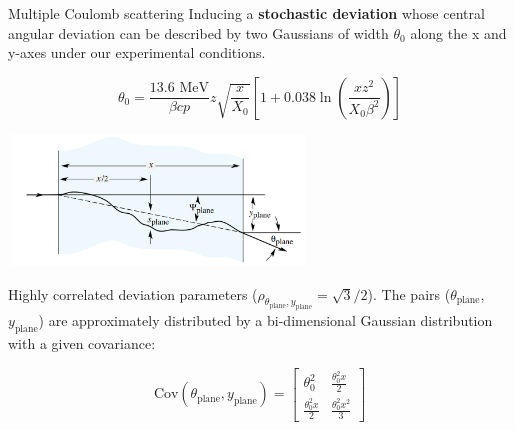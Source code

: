 \documentclass[handout,8 pt]{beamer}
\begin{document}
\begin{frame}{Multiple Coulomb scattering}
\justifying
Inducing a \alert{\textbf{stochastic deviation}} whose central angular deviation can be described by two Gaussians of width $\theta_0$ along the x and y-axes under our experimental conditions.

\begin{equation*}
\label{eq:Moliere}
\theta_0 = \frac{13.6 \text{ MeV}}{\beta c p} z \sqrt{\frac{x}{X_0}} \left [1 + 0.038 \ln \left (\frac{x z^2}{X_0 \beta^2} \right ) \right ]
\end{equation*}

\begin{center}
\includegraphics[width=8cm, height=3.5cm]{figs/moliere.png}
\end{center} \vfill

Highly correlated deviation parameters ($\rho_{\theta_\text{plane}, y_\text{plane}}=\sqrt{3}/2$). The pairs ($\theta_\text{plane}$, $y_\text{plane}$) are approximately distributed by a bi-dimensional Gaussian distribution with a given covariance:

\begin{equation}
\text{Cov}(\theta_\text{plane}, y_\text{plane}) = \begin{bmatrix}
\theta^2_0 & \frac{\theta_0^2x}{2} \\
\frac{\theta_0^2x}{2} & \frac{\theta_0^2x^2}{3} 
\end{bmatrix}
\end{equation} \vfill
\end{frame}
\end{document}
